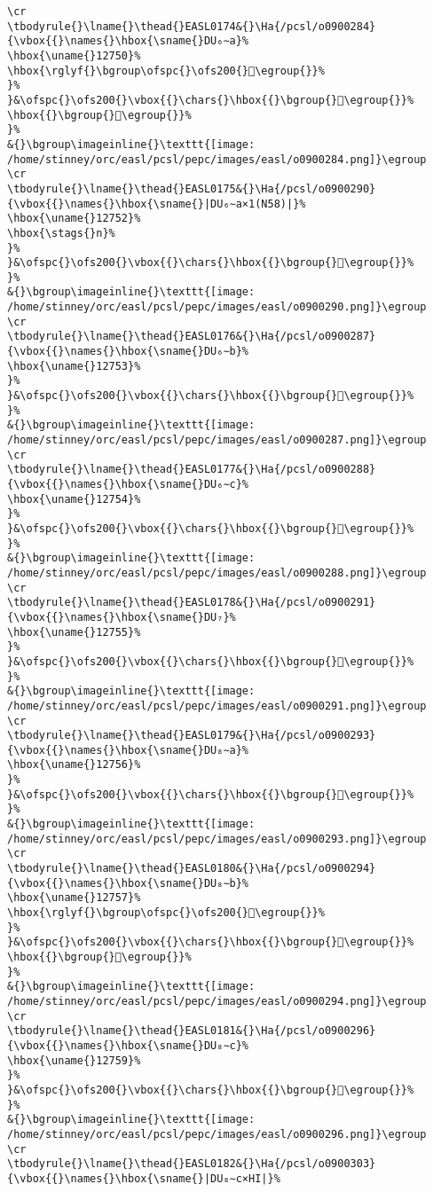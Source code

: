 \begin{verbatim}
\cr
\tbodyrule{}\lname{}\thead{}EASL0174&{}\Ha{/pcsl/o0900284}{\vbox{{}\names{}\hbox{\sname{}DU₆∼a}%
\hbox{\uname{}12750}%
\hbox{\rglyf{}\bgroup\ofspc{}\ofs200{}𒝐\egroup{}}%
}%
}&\ofspc{}\ofs200{}\vbox{{}\chars{}\hbox{{}\bgroup{}𒝑\egroup{}}%
\hbox{{}\bgroup{}𒝐\egroup{}}%
}%
&{}\bgroup\imageinline{}\texttt{[image: /home/stinney/orc/easl/pcsl/pepc/images/easl/o0900284.png]}\egroup
\cr
\tbodyrule{}\lname{}\thead{}EASL0175&{}\Ha{/pcsl/o0900290}{\vbox{{}\names{}\hbox{\sname{}|DU₆∼a×1(N58)|}%
\hbox{\uname{}12752}%
\hbox{\stags{}n}%
}%
}&\ofspc{}\ofs200{}\vbox{{}\chars{}\hbox{{}\bgroup{}𒝒\egroup{}}%
}%
&{}\bgroup\imageinline{}\texttt{[image: /home/stinney/orc/easl/pcsl/pepc/images/easl/o0900290.png]}\egroup
\cr
\tbodyrule{}\lname{}\thead{}EASL0176&{}\Ha{/pcsl/o0900287}{\vbox{{}\names{}\hbox{\sname{}DU₆∼b}%
\hbox{\uname{}12753}%
}%
}&\ofspc{}\ofs200{}\vbox{{}\chars{}\hbox{{}\bgroup{}𒝓\egroup{}}%
}%
&{}\bgroup\imageinline{}\texttt{[image: /home/stinney/orc/easl/pcsl/pepc/images/easl/o0900287.png]}\egroup
\cr
\tbodyrule{}\lname{}\thead{}EASL0177&{}\Ha{/pcsl/o0900288}{\vbox{{}\names{}\hbox{\sname{}DU₆∼c}%
\hbox{\uname{}12754}%
}%
}&\ofspc{}\ofs200{}\vbox{{}\chars{}\hbox{{}\bgroup{}𒝔\egroup{}}%
}%
&{}\bgroup\imageinline{}\texttt{[image: /home/stinney/orc/easl/pcsl/pepc/images/easl/o0900288.png]}\egroup
\cr
\tbodyrule{}\lname{}\thead{}EASL0178&{}\Ha{/pcsl/o0900291}{\vbox{{}\names{}\hbox{\sname{}DU₇}%
\hbox{\uname{}12755}%
}%
}&\ofspc{}\ofs200{}\vbox{{}\chars{}\hbox{{}\bgroup{}𒝕\egroup{}}%
}%
&{}\bgroup\imageinline{}\texttt{[image: /home/stinney/orc/easl/pcsl/pepc/images/easl/o0900291.png]}\egroup
\cr
\tbodyrule{}\lname{}\thead{}EASL0179&{}\Ha{/pcsl/o0900293}{\vbox{{}\names{}\hbox{\sname{}DU₈∼a}%
\hbox{\uname{}12756}%
}%
}&\ofspc{}\ofs200{}\vbox{{}\chars{}\hbox{{}\bgroup{}𒝖\egroup{}}%
}%
&{}\bgroup\imageinline{}\texttt{[image: /home/stinney/orc/easl/pcsl/pepc/images/easl/o0900293.png]}\egroup
\cr
\tbodyrule{}\lname{}\thead{}EASL0180&{}\Ha{/pcsl/o0900294}{\vbox{{}\names{}\hbox{\sname{}DU₈∼b}%
\hbox{\uname{}12757}%
\hbox{\rglyf{}\bgroup\ofspc{}\ofs200{}𒝗\egroup{}}%
}%
}&\ofspc{}\ofs200{}\vbox{{}\chars{}\hbox{{}\bgroup{}𒝗\egroup{}}%
\hbox{{}\bgroup{}𒝘\egroup{}}%
}%
&{}\bgroup\imageinline{}\texttt{[image: /home/stinney/orc/easl/pcsl/pepc/images/easl/o0900294.png]}\egroup
\cr
\tbodyrule{}\lname{}\thead{}EASL0181&{}\Ha{/pcsl/o0900296}{\vbox{{}\names{}\hbox{\sname{}DU₈∼c}%
\hbox{\uname{}12759}%
}%
}&\ofspc{}\ofs200{}\vbox{{}\chars{}\hbox{{}\bgroup{}𒝙\egroup{}}%
}%
&{}\bgroup\imageinline{}\texttt{[image: /home/stinney/orc/easl/pcsl/pepc/images/easl/o0900296.png]}\egroup
\cr
\tbodyrule{}\lname{}\thead{}EASL0182&{}\Ha{/pcsl/o0900303}{\vbox{{}\names{}\hbox{\sname{}|DU₈∼c×HI|}%

\end{verbatim}
